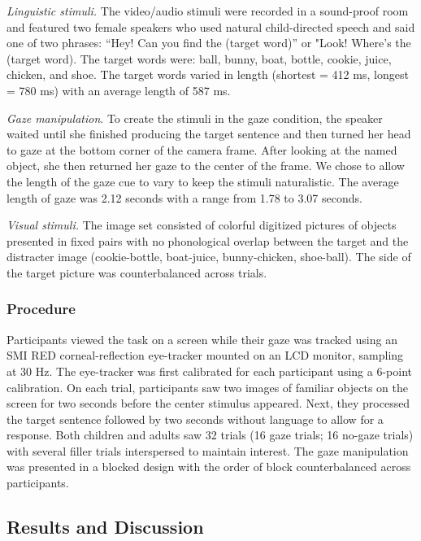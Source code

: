 \documentclass[10pt, letterpaper]{article}
\begin{document}
\emph{Linguistic stimuli.} The video/audio stimuli were recorded in a
sound-proof room and featured two female speakers who used natural
child-directed speech and said one of two phrases: ``Hey! Can you find
the (target word)'' or "Look! Where's the (target word). The target
words were: ball, bunny, boat, bottle, cookie, juice, chicken, and shoe.
The target words varied in length (shortest = 412 ms, longest = 780 ms)
with an average length of 587 ms.

\emph{Gaze manipulation}. To create the stimuli in the gaze condition,
the speaker waited until she finished producing the target sentence and
then turned her head to gaze at the bottom corner of the camera frame.
After looking at the named object, she then returned her gaze to the
center of the frame. We chose to allow the length of the gaze cue to
vary to keep the stimuli naturalistic. The average length of gaze was
2.12 seconds with a range from 1.78 to 3.07 seconds.

\emph{Visual stimuli.} The image set consisted of colorful digitized
pictures of objects presented in fixed pairs with no phonological
overlap between the target and the distracter image (cookie-bottle,
boat-juice, bunny-chicken, shoe-ball). The side of the target picture
was counterbalanced across trials.

\hypertarget{procedure}{%
\subsubsection{Procedure}\label{procedure}}

Participants viewed the task on a screen while their gaze was tracked
using an SMI RED corneal-reflection eye-tracker mounted on an LCD
monitor, sampling at 30 Hz. The eye-tracker was first calibrated for
each participant using a 6-point calibration. On each trial,
participants saw two images of familiar objects on the screen for two
seconds before the center stimulus appeared. Next, they processed the
target sentence followed by two seconds without language to allow for a
response. Both children and adults saw 32 trials (16 gaze trials; 16
no-gaze trials) with several filler trials interspersed to maintain
interest. The gaze manipulation was presented in a blocked design with
the order of block counterbalanced across participants.

\hypertarget{results-and-discussion}{%
\subsection{Results and Discussion}\label{results-and-discussion}}
\end{document}
